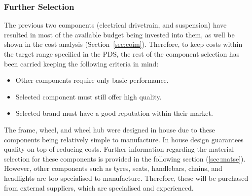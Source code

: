 \documentclass[a4paper,11pt]{article}
\begin{document}
\subsubsection{Further Selection}

The previous two components (electrical drivetrain, and suspension) have resulted in most of the available budget being invested into them, as well be shown in the cost analysis (Section~\ref{sec:coim}). Therefore, to keep costs within the target range specified in the PDS, the rest of the component selection has been carried keeping the following criteria in mind: 

\begin{itemize}
	\setlength{\itemsep}{0pt}
	\item Other components require only basic performance.
	\item Selected component must still offer high quality.
	\item Selected brand must have a good reputation within their market.
\end{itemize}

The frame, wheel, and wheel hub were designed in house due to these components being relatively simple to manufacture. In house design guarantees quality on top of reducing costs. Further information regarding the material selection for these components is provided in the following section (\ref{sec:matse}). However, other components such as tyres, seats, handlebars, chains, and headlights are too specialised to manufacture. Therefore, these will be purchased from external suppliers, which are specialised and experienced. 
\end{document}
